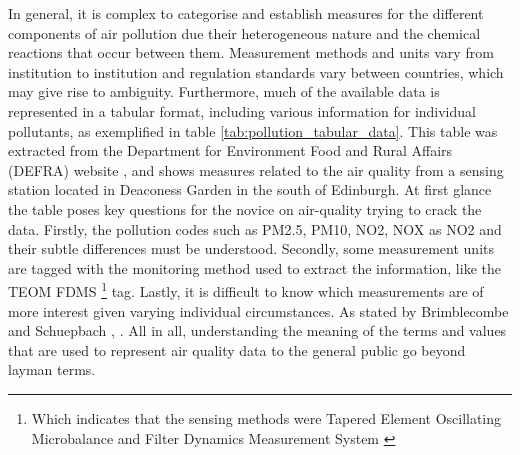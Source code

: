 In general, it is complex to categorise and establish measures for the different components of air pollution due their heterogeneous nature and the chemical reactions that occur between them. Measurement methods and units vary from institution to institution and regulation standards vary between countries, which may give rise to ambiguity. Furthermore, much of the available data is represented in a tabular format, including various information for individual pollutants, as exemplified in table \ref{tab:pollution_tabular_data}. This table was extracted from the  Department for Environment Food and Rural Affairs (DEFRA) website \cite{DepartmentforEnvironmenta}, and shows measures related to the air quality from a sensing station located in Deaconess Garden in the south of Edinburgh. At first glance the table poses key questions for the novice on air-quality trying to crack the data. Firstly, the pollution codes such as PM2.5, PM10, NO2, NOX as NO2 and their subtle differences must be understood. Secondly, some measurement units are tagged with the monitoring method used to extract the information, like the TEOM FDMS \footnote{Which indicates that the sensing methods were Tapered Element Oscillating Microbalance and Filter Dynamics Measurement System \cite{Quality2005}} tag. Lastly, it is difficult to know which measurements are of more interest given varying individual circumstances. As stated by Brimblecombe and Schuepbach \cite{P.Brimblecombe2008}, .  All in all, understanding the meaning of the terms and values that are used to represent air quality data to the general public go beyond layman terms.
